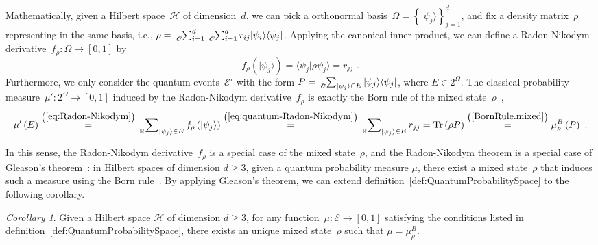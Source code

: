 \documentclass{article}
\theoremstyle{remark}
\newtheorem{cor}{Corollary}
\newcommand{\events}{\ensuremath{\mathcal{E}}}
\newcommand{\pmeas}{\ensuremath{\mu}}
\newcommand{\Hilb}{\mathcal{H}}
\newcommand{\ket}[1]{|#1\rangle}
\newcommand{\bra}[1]{\langle#1|}
\newcommand{\ip}[2]{\langle #1 | #2 \rangle}
\newcommand{\proj}[1]{|#1 \rangle\langle #1 |}
\newcommand{\Tr}{\mathop{\mathrm{Tr}}\nolimits}
\begin{document}
Mathematically, given a Hilbert space~$\Hilb$ of dimension~$d$,
we can pick a orthonormal basis~$\Omega=\left\{ \ket{\psi_{j}}\right\} _{j=1}^{d}$,
and fix a density matrix~$\rho$ representing in the same basis,
i.e., $\rho=\tensor*[_{\mathscr{O}}]{\sum}{_{i=1}^{d}}\tensor*[_{\mathscr{O}}]{\sum}{_{i=1}^{d}}r_{ij}\ket{\psi_{i}}\bra{\psi_{j}}$.
Applying the canonical inner product, we can define a Radon-Nikodym
derivative~$f_{\rho}:\Omega\rightarrow[0,1]$ by
\begin{equation}
f_{\rho}\left(\ket{\psi_{j}}\right)=\ip{\psi_{j}}{\rho\psi_{j}}=r_{jj}\textrm{ .}\label{eq:quantum-Radon-Nikodym}
\end{equation}
Furthermore, we only consider the quantum events~$\events'$ with
the form $P=\tensor*[_{\mathscr{O}}]{\sum}{_{\ket{\psi_{j}}\in E}}\proj{\psi_{j}}$,
where $E\in2^{\Omega}$. The classical probability measure~$\pmeas':2^{\Omega}\rightarrow[0,1]$
induced by the Radon-Nikodym derivative~$f_{\rho}$ is exactly the
Born rule of the mixed state~$\rho$~\cite{Maassen2010}, 
\begin{equation}
\pmeas'\left(E\right)\overset{\left(\ref{eq:Radon-Nikodym}\right)}{=}\sideset{_{\mathbb{R}}}{_{\ket{\psi_{j}}\in E}}\sum f_{\rho}\left(\ket{\psi_{j}}\right)\overset{\left(\ref{eq:quantum-Radon-Nikodym}\right)}{=}\sideset{_{\mathbb{R}}}{_{\ket{\psi_{j}}\in E}}\sum r_{jj}=\Tr\left(\rho P\right)\overset{\left(\ref{BornRule.mixed}\right)}{=}\mu_{\rho}^{B}\left(P\right)\textrm{ .}\label{BornRule.mixed-1}
\end{equation}

In this sense, the Radon-Nikodym derivative~$f_{\rho}$ is a special
case of the mixed state~$\rho$, and the Radon-Nikodym theorem is
a special case of Gleason's theorem~\cite{HollandJr1970,Redhead1987-REDINA,Jaeger2007}:
in Hilbert spaces of dimension $d\geq3$, given a quantum probability
measure $\mu$, there exist a mixed state~$\rho$ that induces such
a measure using the Born rule~\cite{gleason1957,Redhead1987-REDINA,peres1995quantum}.
By applying Gleason's theorem, we can extend definition~\ref{def:QuantumProbabilitySpace}
to the following corollary.

\begin{cor}\label{cor:Gleason's}Given a Hilbert space $\Hilb$ of
dimension $d\geq3$, for any function~$\mu:\events\rightarrow[0,1]$
satisfying the conditions listed in definition~\ref{def:QuantumProbabilitySpace},
there exists an unique mixed state~$\rho$ such that $\mu=\mu_{\rho}^{B}$.\end{cor}
\end{document}
